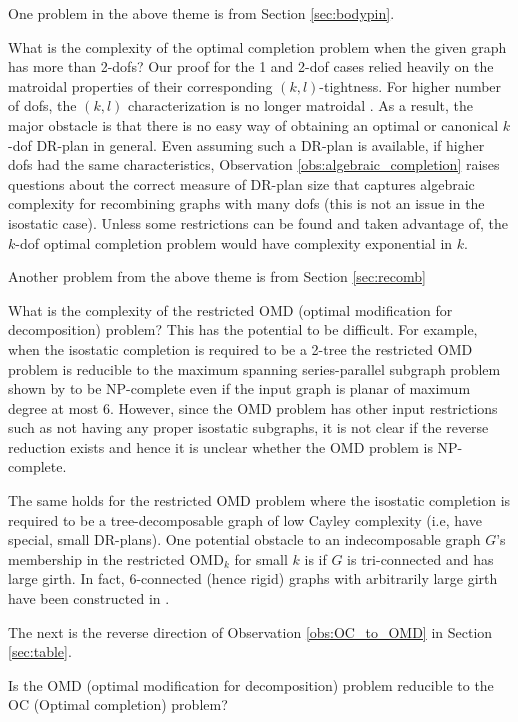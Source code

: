 One problem in the above theme is from Section \ref{sec:bodypin}.
\begin{openproblem}
    What is the complexity of the optimal completion problem when the given graph has more than 2-dofs? Our proof for the 1 and 2-dof cases relied heavily on the matroidal properties of their corresponding $(k,l)$-tightness. For higher number of dofs, the $(k,l)$ characterization is no longer matroidal \cite{Lee:2007:PGA}. As a result, the major obstacle is that there is no easy way of obtaining an optimal or canonical $k$-dof DR-plan in general. Even assuming such  a DR-plan is available, if higher dofs had the same characteristics, Observation \ref{obs:algebraic_completion} raises questions about the correct measure of DR-plan size that captures algebraic complexity for recombining graphs with many dofs (this is not an issue in the isostatic case). Unless some restrictions can be found and taken advantage of, the $k$-dof optimal completion problem would  have complexity exponential in $k$.
\end{openproblem}

Another problem from the above theme is from Section \ref{sec:recomb}
\begin{openproblem}
    What is the complexity of the restricted OMD (optimal modification for decomposition) problem? This has the potential to be difficult. For example, when the isostatic completion is required to be a 2-tree the restricted OMD problem is reducible to the maximum spanning series-parallel subgraph problem shown by \cite{cai1993spanning} to be NP-complete even if the input graph is planar of maximum degree at most 6. However, since the OMD problem has other input restrictions such as not having any proper isostatic subgraphs, it is not clear if the reverse reduction exists and hence it is unclear whether the OMD problem is NP-complete.

    The same holds for the restricted OMD problem where the isostatic completion is required to be a tree-decomposable graph of low Cayley complexity (i.e, have special, small DR-plans). One potential obstacle to an indecomposable graph $G$'s membership in the restricted OMD$_k$ for small $k$ is if $G$ is tri-connected and has large girth. In fact, 6-connected (hence rigid) graphs with arbitrarily large girth have been constructed in \cite{servatius2000rigidity}.
\end{openproblem}

The next is the reverse direction of Observation \ref{obs:OC_to_OMD} in Section \ref{sec:table}.
\begin{openproblem}
    Is the OMD (optimal modification for decomposition) problem reducible to the OC (Optimal completion) problem?
\end{openproblem}

